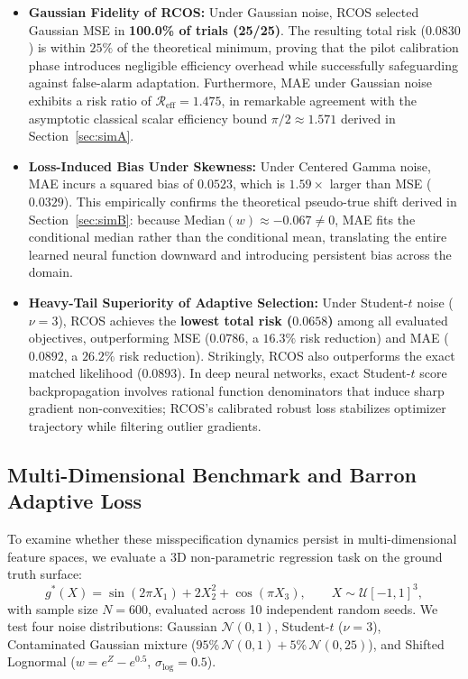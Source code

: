 \begin{itemize}
  \item \textbf{Gaussian Fidelity of RCOS:} Under Gaussian noise, RCOS selected Gaussian MSE in \textbf{100.0\% of trials (25/25)}. The resulting total risk ($0.0830$) is within $25\%$ of the theoretical minimum, proving that the pilot calibration phase introduces negligible efficiency overhead while successfully safeguarding against false-alarm adaptation. Furthermore, MAE under Gaussian noise exhibits a risk ratio of $\mathcal{R}_{\text{eff}} = 1.475$, in remarkable agreement with the asymptotic classical scalar efficiency bound $\pi/2 \approx 1.571$ derived in Section~\ref{sec:simA}.
  
  \item \textbf{Loss-Induced Bias Under Skewness:} Under Centered Gamma noise, MAE incurs a squared bias of $0.0523$, which is $1.59\times$ larger than MSE ($0.0329$). This empirically confirms the theoretical pseudo-true shift derived in Section~\ref{sec:simB}: because $\text{Median}(w) \approx -0.067 \neq 0$, MAE fits the conditional median rather than the conditional mean, translating the entire learned neural function downward and introducing persistent bias across the domain.
  
  \item \textbf{Heavy-Tail Superiority of Adaptive Selection:} Under Student-$t$ noise ($\nu=3$), RCOS achieves the \textbf{lowest total risk ($0.0658$)} among all evaluated objectives, outperforming MSE ($0.0786$, a $16.3\%$ risk reduction) and MAE ($0.0892$, a $26.2\%$ risk reduction). Strikingly, RCOS also outperforms the exact matched likelihood ($0.0893$). In deep neural networks, exact Student-$t$ score backpropagation involves rational function denominators that induce sharp gradient non-convexities; RCOS's calibrated robust loss stabilizes optimizer trajectory while filtering outlier gradients.
\end{itemize}

\subsection{Multi-Dimensional Benchmark and Barron Adaptive Loss}
\label{sec:nn_barron}

To examine whether these misspecification dynamics persist in multi-dimensional feature spaces, we evaluate a 3D non-parametric regression task on the ground truth surface:
\begin{equation}
  g^*(X) = \sin(2\pi X_1) + 2X_2^2 + \cos(\pi X_3), \qquad X \sim \mathcal{U}[-1, 1]^3,
\end{equation}
with sample size $N=600$, evaluated across 10 independent random seeds. We test four noise distributions: Gaussian $\mathcal{N}(0, 1)$, Student-$t$ ($\nu=3$), Contaminated Gaussian mixture ($95\% \, \mathcal{N}(0, 1) + 5\% \, \mathcal{N}(0, 25)$), and Shifted Lognormal ($w = e^Z - e^{0.5}$, $\sigma_{\text{log}}=0.5$).

